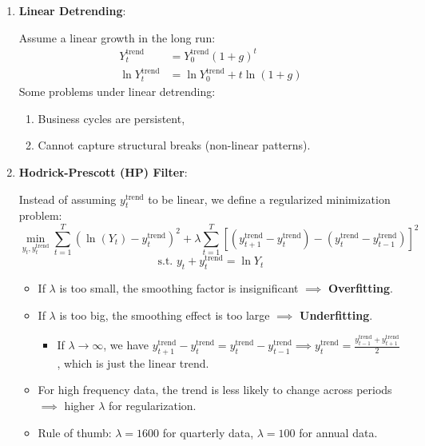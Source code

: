 \documentclass[notitlepage]{article}
\begin{document}
\begin{enumerate}
\item \textbf{Linear Detrending}:

Assume a linear growth in the long run:
\begin{align*}
Y^{\text{trend}}_t &= Y^{\text{trend}}_0 (1 + g)^t \\
\ln Y^{\text{trend}}_t &= \ln Y^{\text{trend}}_0 + t \ln(1+g)
\end{align*}
Some problems under linear detrending:
\begin{enumerate}[(1)]
\item Business cycles are persistent,
\item Cannot capture structural breaks (non-linear patterns).
\end{enumerate}

\item \textbf{Hodrick-Prescott (HP) Filter}:

Instead of assuming $y_t^{\text{trend}}$ to be linear, we define a regularized minimization problem:
\[
\min_{y_t, y_t^{\text{trend}}} \sum_{t=1}^T (\ln(Y_t) - y_t^{\text{trend}})^2 + \lambda \sum_{t=1}^T [(y_{t+1}^{\text{trend}} - y_t^{\text{trend}}) - (y_t^{\text{trend}} - y_{t-1}^{\text{trend}})]^2
\]
\[
\text{s.t. } y_t + y_t^{\text{trend}} = \ln Y_t
\]
\begin{itemize}
\item If $\lambda$ is too small, the smoothing factor is insignificant $\implies$ \textbf{Overfitting}.
\item If $\lambda$ is too big, the smoothing effect is too large $\implies$ \textbf{Underfitting}.
\begin{itemize}
\item If $\lambda \to \infty$, we have $y_{t+1}^{\text{trend}} - y_t^{\text{trend}} = y_t^{\text{trend}} - y_{t-1}^{\text{trend}} \implies y_t^{\text{trend}} = \frac{y_{t-1}^{\text{trend}} + y_{t+1}^{\text{trend}}}{2}$, which is just the linear trend.
\end{itemize}
\item For high frequency data, the trend is less likely to change across periods $\implies$ higher $\lambda$ for regularization.
\item Rule of thumb: $\lambda = 1600$ for quarterly data, $\lambda = 100$ for annual data.
\end{itemize}
\end{enumerate}
\end{document}
